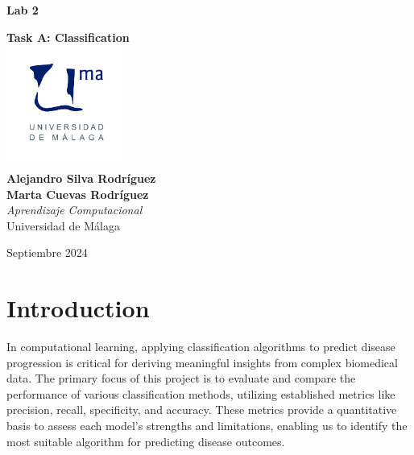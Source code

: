 \documentclass{article}
\begin{document}
\begin{titlepage}
	\centering
	\vspace*{3cm}
	
	{\Huge \textbf{Lab 2}\\[0.5cm]}
	
	{\Huge \textbf{Task A: Classification}\\[0.5cm]}
	\vspace{2cm}
	\includegraphics[width=0.3\textwidth]{images/uma_logo.jpg}\\[1cm]
	
	{\LARGE \textbf{Alejandro Silva Rodríguez}\\[0.5cm]}
	{\LARGE \textbf{Marta Cuevas Rodríguez}\\[0.5cm]}
	{\large \textit{Aprendizaje Computacional}\\
		Universidad de Málaga\\
		}
	
	\vfill
	
	{\large Septiembre 2024}
\end{titlepage}

\tableofcontents

\newpage

\section{Introduction}

In computational learning, applying classification algorithms to predict disease progression is critical for deriving meaningful insights from complex biomedical data. The primary focus of this project is to evaluate and compare the performance of various classification methods, utilizing established metrics like precision, recall, specificity, and accuracy. These metrics provide a quantitative basis to assess each model's strengths and limitations, enabling us to identify the most suitable algorithm for predicting disease outcomes.
\end{document}
